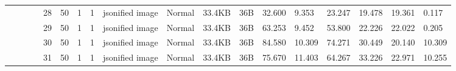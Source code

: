 \begin{landscape}
\begin{table}[]
{\begin{tabular}{@{}ccccllllllllllllll@{}}
                                                                                   &                              &                                &                                                                                                          & 28                                                    & 50                                       & 1                                          & 1                                 & jsonified image                  & Normal                             & 33.4KB                                        & 36B                                             & 32.600                  & 9.353    & 23.247                       & 19.478                  & 19.361   & 0.117                        \\
                                                                                   &                              &                                &                                                                                                          & 29                                                    & 50                                       & 1                                          & 1                                 & jsonified image                  & Normal                             & 33.4KB                                        & 36B                                             & 63.253                  & 9.452    & 53.800                       & 22.226                  & 22.022   & 0.205                        \\
                                                                                   &                              &                                &                                                                                                          & 30                                                    & 50                                       & 1                                          & 1                                 & jsonified image                  & Normal                             & 33.4KB                                        & 36B                                             & 84.580                  & 10.309   & 74.271                       & 30.449                  & 20.140   & 10.309                       \\
                                                                                   &                              &                                &                                                                                                          & 31                                                    & 50                                       & 1                                          & 1                                 & jsonified image                  & Normal                             & 33.4KB                                        & 36B                                             & 75.670                  & 11.403   & 64.267                       & 33.226                  & 22.971   & 10.255                       \\

\end{tabular}}
\end{table}
\end{landscape}
